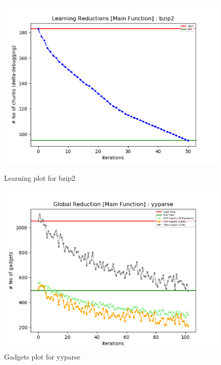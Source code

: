 \documentclass{relatorio}
\begin{document}
\begin{figure}[H]
		\includegraphics[width=0.65\linewidth]{imgs/chisel_learning_bzip2_plot.png}
		\caption{Learning plot for \color{blue} bzip2}%
		\label{fig:plant}
		\centering
		\captionsetup{justification=centering}
		\includegraphics[width=0.65\linewidth]{imgs/chisel_gadgets_yyparse_plot.png}
		\caption{Gadgets plot for \color{blue} yyparse}%
		\label{fig:plant}
	\end{figure}
\end{document}
